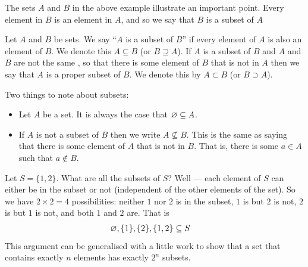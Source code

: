 The sets $A$ and $B$ in the above example illustrate an important point. Every
element in $B$ is an element in $A$, and so we say that $B$ is a subset of $A$
\begin{defn}
Let $A$ and $B$ be sets. We say ``$A$ is a subset of $B$'' if every
element of $A$ is also an element of $B$. We denote this $A \subseteq B$ (or $B
\supseteq A$). If $A$ is a subset of $B$ and $A$ and $B$ are not the same , so
that there is some element of $B$ that is not in $A$ then we say that $A$ is a
proper subset of $B$. We denote this by $A \subset B$ (or $B \supset A$).
\end{defn}
Two things to note about subsets:
\begin{itemize}
\item Let $A$ be a set. It is always the case that ${\varnothing} \subseteq A$.
\item If $A$ is not a subset of $B$ then we write $A \not\subseteq B$. This is
the same as saying that there is some element of $A$ that is not in $B$. That
is, there is some $a \in A$ such that $a \notin B$.
\end{itemize}
\begin{eg}[subsets]
Let $S = \{1,2\}$. What are all the subsets of $S$? Well --- each element of
$S$ can either be in the subset or not (independent of the other elements of
the set). So we have $2\times2 = 4$ possibilities: neither $1$ nor $2$ is in the
subset, $1$ is but $2$ is not, $2$ is but $1$ is not, and both $1$ and $2$ are.
That is
\begin{align*}
  {\varnothing}, \{1\}, \{2\}, \{1,2\} & \subseteq S
\end{align*}
This argument can be generalised with a little work to show that a set that
contains exactly $n$ elements has exactly $2^n$ subsets.
\end{eg}

